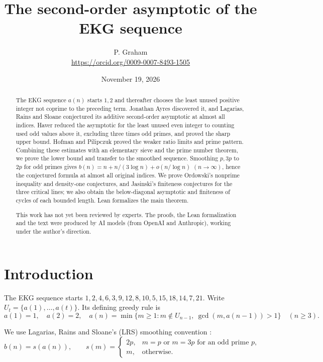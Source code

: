 \documentclass[11pt]{article}
\title{The second-order asymptotic of the EKG sequence}
\author{P. Graham\\ \small\url{https://orcid.org/0009-0007-8493-1505}}
\date{November 19, 2026}
\theoremstyle{remark}
\newcommand{\U}{U}
\begin{document}
\maketitle

\begin{abstract}
The EKG sequence $a(n)$ starts $1,2$ and thereafter chooses the least
unused positive integer not coprime to the preceding term. Jonathan
Ayres discovered it, and Lagarias, Rains and Sloane conjectured
its additive second-order asymptotic at almost all indices. Haver reduced
the asymptotic for the least unused even integer to counting used odd
values above it, excluding three times odd primes, and proved the sharp
upper bound. Hofman and Pilipczuk proved the weaker ratio limits and prime pattern.
Combining these estimates with an elementary sieve and the prime number
theorem, we prove the lower bound and transfer to the smoothed sequence. Smoothing $p,3p$ to $2p$ for odd primes gives
$b(n)=n+n/(3\log n)+o(n/\log n)$ $(n\to\infty)$, hence the
conjectured formula at almost all original indices.
We prove Ordowski's nonprime inequality and density-one conjectures,
and Jasinski's finiteness conjectures for the three critical lines;
we also obtain the below-diagonal asymptotic and finiteness of cycles
of each bounded length.
Lean formalizes the main theorem.

This work has not yet been reviewed by experts.
The proofs, the Lean formalization and the text were produced by AI models
(from OpenAI and Anthropic), working under the author's direction.
\end{abstract}

\section{Introduction}
The EKG sequence starts $1,2,4,6,3,9,12,8,10,5,15,18,14,7,21$.
Write $\U_t=\{a(1),\ldots,a(t)\}$. Its defining greedy rule is
\begin{equation}\label{eq:rule}
 a(1)=1,\quad a(2)=2,\quad
 a(n)=\min\{m\geq 1:m\notin\U_{n-1},\
                         \gcd(m,a(n-1))>1\}\quad(n\geq3).
\end{equation}

We use Lagarias, Rains and Sloane's (LRS) smoothing convention
\cite[Figure~5]{lrs}:
\begin{equation}\label{eq:smooth}
 b(n)=s(a(n)),\qquad
 s(m)=\begin{cases}
  2p,&m=p\text{ or }m=3p\text{ for an odd prime }p,\\
  m,&\text{otherwise}.
 \end{cases}
\end{equation}
\end{document}

